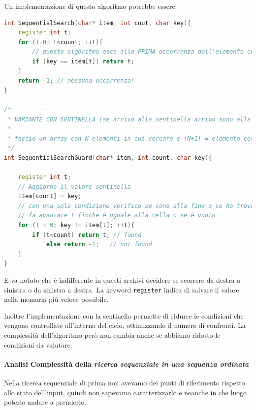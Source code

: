 \documentclass[
  paper=a4,
  oneside  ,captions=tableheading
]{scrbook}
\newcommand{\passthrough}[1]{#1}
\begin{document}
Un implementazione di questo algoritmo potrebbe essere:

\begin{lstlisting}[language={C++}]
int SequentialSearch(char* item, int cout, char key){
    register int t;
    for (t=0; t<count; ++t){
        // questo algoritmo esce alla PRIMA occorrenza dell'elemento cercato
        if (key == item[t]) return t;
    }
    return -1; // nessuna occorrenza!
}

/*       --- 
 * VARIANTE CON SENTINELLA (se arrivo alla sentinella arrivo sono alla fine)
 *       --- 
 * faccio un array con N elementi in cui cercare e (N+1) = elemento cercato, facendo così posso fare la ricerca con un solo elemento.
 */
int SequentialSearchGuard(char* item, int count, char key){
    
    register int t;
    // Aggiorno il valore sentinella
    item[count] = key;
    // con una sola condizione verifico se sono alla fine o se ho trovato l'elemento
    // fa avanzare t finchè è uguale alla cella o se è vuoto
    for (t = 0; key != item[t]; ++t){
        if (t<count) return t; // found
            else return -1;   // not found
    }
}
\end{lstlisting}

E va notato che è indifferente in questi archivi decidere se scorrere da
destra a sinistra o da sinistra a destra. La keyword
\passthrough{\lstinline!register!} indica di salvare il valore nella
memoria più veloce possibile.

Inoltre l'implementazione con la sentinella permette di ridurre le
condizioni che vengono controllate all'interno del ciclo, ottimizzando
il numero di confronti. La complessità dell'algoritmo però non cambia
anche se abbiamo ridotto le condizioni da valutare.

\hypertarget{analisi-complessituxe0-della-ricerca-sequenziale-in-una-sequenza-ordinata}{%
\paragraph{\texorpdfstring{Analisi Complessità della \emph{ricerca
sequenziale in una sequenza
ordinata}}{Analisi Complessità della ricerca sequenziale in una sequenza ordinata}}\label{analisi-complessituxe0-della-ricerca-sequenziale-in-una-sequenza-ordinata}}

Nella ricerca sequenziale di prima non avevamo dei punti di riferimento
rispetto allo stato dell'input, quindi non sapevamo caratterizzarlo e
neanche in che luogo poterlo andare a prenderlo.
\end{document}
